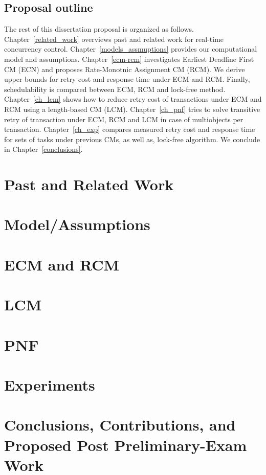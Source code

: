 \documentclass[12pt,english]{report}
\begin{document}
\section{\label{sec:proposal outline}Proposal outline}
The rest of this dissertation proposal is organized as follows. Chapter~\ref{related_work} overviews past and related work for real-time concurrency control. Chapter~\ref{models_assmuptions} provides our computational model and assumptions. Chapter~\ref{ecm-rcm} investigates Earliest Deadline First CM (ECN) and proposes Rate-Monotnic Assignment CM (RCM). We derive upper bounds for retry cost and response time under ECM and RCM. Finally, schedulability is compared between ECM, RCM and lock-free method. Chapter~\ref{ch_lcm} shows how to reduce retry cost of transactions under ECM and RCM using a length-based CM (LCM). Chapter~\ref{ch_pnf} tries to solve transitive retry of transaction under ECM, RCM and LCM in case of multiobjects per transaction. Chapter~\ref{ch_exp} compares measured retry cost and response time for sets of tasks under previous CMs, as well as, lock-free algorithm. We conclude in Chapter~\ref{conclusions}.

\chapter{\label{related_work}Past and Related Work}

\chapter{\label{models_assmuptions}Model/Assumptions}

\chapter{\label{ecm-rcm}ECM and RCM}

\chapter{\label{ch_lcm}LCM}

\chapter{\label{ch_pnf}PNF}

\chapter{\label{ch_exp}Experiments}

\chapter{\label{conclusions}Conclusions, Contributions, and Proposed Post Preliminary-Exam Work}




\end{document}
